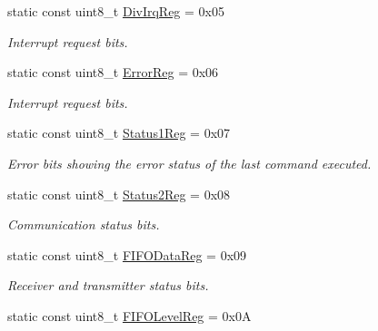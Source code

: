 \begin{DoxyCompactItemize}
\mbox{\label{classMFRC522_ae83309384b82b6f274b5775cd76b0510}} 
static const uint8\+\_\+t \hyperlink{classMFRC522_ae83309384b82b6f274b5775cd76b0510}{Div\+Irq\+Reg} = 0x05
\begin{DoxyCompactList}\small\item\em Interrupt request bits. \end{DoxyCompactList}\item 
\mbox{\label{classMFRC522_abd929db950e038f6b964d0620dc4a606}} 
static const uint8\+\_\+t \hyperlink{classMFRC522_abd929db950e038f6b964d0620dc4a606}{Error\+Reg} = 0x06
\begin{DoxyCompactList}\small\item\em Interrupt request bits. \end{DoxyCompactList}\item 
\mbox{\label{classMFRC522_aa08149e9d55faba97505fff8f089df6a}} 
static const uint8\+\_\+t \hyperlink{classMFRC522_aa08149e9d55faba97505fff8f089df6a}{Status1\+Reg} = 0x07
\begin{DoxyCompactList}\small\item\em Error bits showing the error status of the last command executed. \end{DoxyCompactList}\item 
\mbox{\label{classMFRC522_a559ef7dfe0c245735642111734067580}} 
static const uint8\+\_\+t \hyperlink{classMFRC522_a559ef7dfe0c245735642111734067580}{Status2\+Reg} = 0x08
\begin{DoxyCompactList}\small\item\em Communication status bits. \end{DoxyCompactList}\item 
\mbox{\label{classMFRC522_a83b5946c82d3ea0efbeb433fc7883819}} 
static const uint8\+\_\+t \hyperlink{classMFRC522_a83b5946c82d3ea0efbeb433fc7883819}{F\+I\+F\+O\+Data\+Reg} = 0x09
\begin{DoxyCompactList}\small\item\em Receiver and transmitter status bits. \end{DoxyCompactList}\item 
\mbox{\label{classMFRC522_add57d42bb2de0e5d860b103f62c08a9d}} 
static const uint8\+\_\+t \hyperlink{classMFRC522_add57d42bb2de0e5d860b103f62c08a9d}{F\+I\+F\+O\+Level\+Reg} = 0x0A

\end{DoxyCompactItemize}
